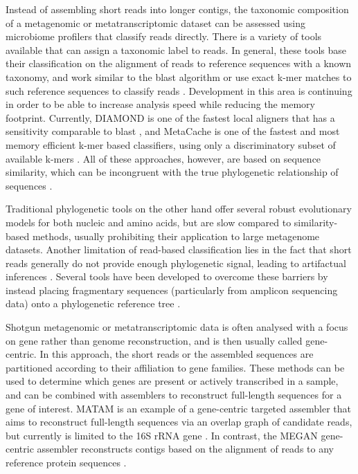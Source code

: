 \documentclass{bioinfo}
\begin{document}
Instead of assembling short reads into longer contigs, the taxonomic composition of a metagenomic or metatranscriptomic dataset can be assessed using microbiome profilers that classify reads directly. There is a variety of tools available that can assign a taxonomic label to reads. In general, these tools base their classification on the alignment of reads to reference sequences with a known taxonomy, and work similar to the blast algorithm \citep[e.g. ][]{Huson2016,Truong2015} or use exact k-mer matches to such reference sequences to classify reads \citep[e.g. ][]{Ounit2015,Wood2014}. Development in this area is continuing in order to be able to increase analysis speed while reducing the memory footprint. Currently, DIAMOND is one of the fastest local aligners that has a sensitivity comparable to blast \citep{Buchfink2014}, and MetaCache is one of the fastest and most memory efficient k-mer based classifiers, using only a discriminatory subset of available k-mers \citep{Muller2017}. All of these approaches, however, are based on sequence similarity, which can be incongruent with the true phylogenetic relationship of sequences \citep{Smith2017}.

Traditional phylogenetic tools on the other hand offer several robust evolutionary models for both nucleic and amino acids, but are slow compared to similarity-based methods, usually prohibiting their application to large metagenome datasets. Another limitation of read-based classification lies in the fact that short reads generally do not provide enough phylogenetic signal, leading to artifactual inferences \citep{Matsen2010}. Several tools have been developed to overcome these barriers by instead placing fragmentary sequences (particularly from amplicon sequencing data) onto a phylogenetic reference tree \citep{Matsen2010,Berger2011b,Barbera2019}.

Shotgun metagenomic or metatranscriptomic data is often analysed with a focus on gene rather than genome reconstruction, and is then usually called gene-centric. In this approach, the short reads or the assembled sequences are partitioned according to their affiliation to gene families. These methods can be used to determine which genes are present or actively transcribed in a sample, and can be combined with assemblers to reconstruct full-length sequences for a gene of interest. MATAM is an example of a gene-centric targeted assembler that aims to reconstruct full-length sequences via an overlap graph of candidate reads, but currently is limited to the 16S rRNA gene \citep{Pericard2017,Gruber-Vodicka2019}. In contrast, the MEGAN gene-centric assembler reconstructs contigs based on the alignment of reads to any reference protein sequences \citep{Huson2017}.
\end{document}
